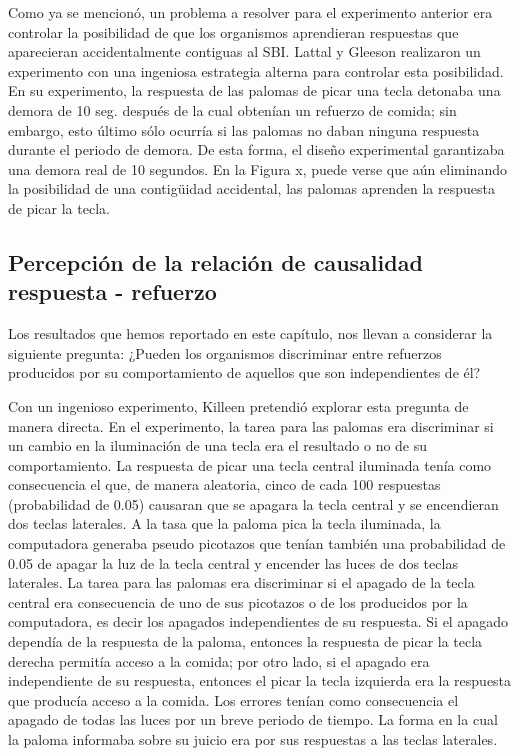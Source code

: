 \documentclass[
  letterpaper,
]{book}
\begin{document}
Como ya se mencionó, un problema a resolver para el experimento anterior
era controlar la posibilidad de que los organismos aprendieran
respuestas que aparecieran accidentalmente contiguas al SBI. Lattal y
Gleeson realizaron un experimento con una ingeniosa estrategia alterna
para controlar esta posibilidad. En su experimento, la respuesta de las
palomas de picar una tecla detonaba una demora de 10 seg. después de la
cual obtenían un refuerzo de comida; sin embargo, esto último sólo
ocurría si las palomas no daban ninguna respuesta durante el periodo de
demora. De esta forma, el diseño experimental garantizaba una demora
real de 10 segundos. En la Figura x, puede verse que aún eliminando la
posibilidad de una contigüidad accidental, las palomas aprenden la
respuesta de picar la tecla.

\subsection{Percepción de la relación de causalidad respuesta -
refuerzo}\label{percepciuxf3n-de-la-relaciuxf3n-de-causalidad-respuesta---refuerzo}

Los resultados que hemos reportado en este capítulo, nos llevan a
considerar la siguiente pregunta: ¿Pueden los organismos discriminar
entre refuerzos producidos por su comportamiento de aquellos que son
independientes de él?

Con un ingenioso experimento, Killeen pretendió explorar esta pregunta
de manera directa. En el experimento, la tarea para las palomas era
discriminar si un cambio en la iluminación de una tecla era el resultado
o no de su comportamiento. La respuesta de picar una tecla central
iluminada tenía como consecuencia el que, de manera aleatoria, cinco de
cada 100 respuestas (probabilidad de 0.05) causaran que se apagara la
tecla central y se encendieran dos teclas laterales. A la tasa que la
paloma pica la tecla iluminada, la computadora generaba pseudo picotazos
que tenían también una probabilidad de 0.05 de apagar la luz de la tecla
central y encender las luces de dos teclas laterales. La tarea para las
palomas era discriminar si el apagado de la tecla central era
consecuencia de uno de sus picotazos o de los producidos por la
computadora, es decir los apagados independientes de su respuesta. Si el
apagado dependía de la respuesta de la paloma, entonces la respuesta de
picar la tecla derecha permitía acceso a la comida; por otro lado, si el
apagado era independiente de su respuesta, entonces el picar la tecla
izquierda era la respuesta que producía acceso a la comida. Los errores
tenían como consecuencia el apagado de todas las luces por un breve
periodo de tiempo. La forma en la cual la paloma informaba sobre su
juicio era por sus respuestas a las teclas laterales.
\end{document}
